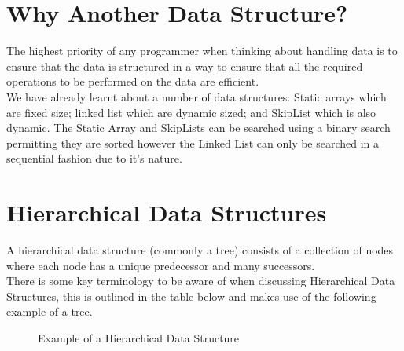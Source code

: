 
\section{Why Another Data Structure?}
The highest priority of any programmer when thinking about handling data is to ensure that the data is structured in a way to ensure that all the required operations to be performed on the data are efficient.\\

We have already learnt about a number of data structures: Static arrays which are fixed size; linked list which are dynamic sized; and SkipList which is also dynamic. The Static Array and SkipLists can be searched using a binary search permitting they are sorted however the Linked List can only be searched in a sequential fashion due to it's nature. 

\section{Hierarchical Data Structures}
A hierarchical data structure (commonly a tree) consists of a collection of nodes where each node has a unique predecessor and many successors.\\

There is some key terminology to be aware of when discussing Hierarchical Data Structures, this is outlined in the table below and makes use of the following example of a tree.

\begin{figure}[H]
    \centering
    
    \caption{Example of a Hierarchical Data Structure}
\end{figure}

